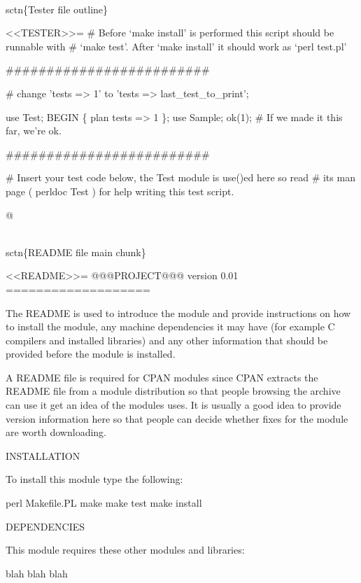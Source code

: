 \documentclass[11pt]{article}
\def\nwendcode{\endtrivlist \endgroup} %
\let\nwdocspar=\par                    %
\begin{document}
\nwenddocs{}\plusendmoddef
\\sctn\{Tester file outline\}

<<TESTER>>=
# Before `make install' is performed this script should be runnable with
# `make test'. After `make install' it should work as `perl test.pl'

#########################

# change 'tests => 1' to 'tests => last_test_to_print';

use Test;
BEGIN \{ plan tests => 1 \};
use Sample;
ok(1); # If we made it this far, we're ok.

#########################

# Insert your test code below, the Test module is use()ed here so read
# its man page ( perldoc Test ) for help writing this test script.

@
\nwendcode{}\nwdocspar

\nwenddocs{}\plusendmoddef
\\sctn\{README file main chunk\}

<<README>>=
@@@PROJECT@@@ version 0.01
===================

The README is used to introduce the module and provide instructions on
how to install the module, any machine dependencies it may have (for
example C compilers and installed libraries) and any other information
that should be provided before the module is installed.

A README file is required for CPAN modules since CPAN extracts the
README file from a module distribution so that people browsing the
archive can use it get an idea of the modules uses. It is usually a
good idea to provide version information here so that people can
decide whether fixes for the module are worth downloading.

INSTALLATION

To install this module type the following:

   perl Makefile.PL
   make
   make test
   make install

DEPENDENCIES

This module requires these other modules and libraries:

  blah blah blah
\end{document}
